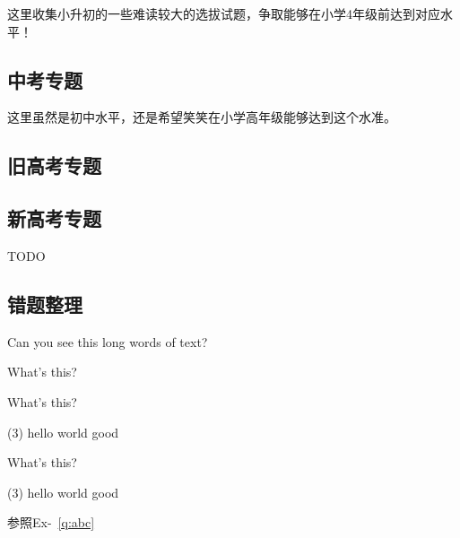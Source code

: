 \documentclass[a4paper]{article}
\begin{document}
这里收集小升初的一些难读较大的选拔试题，争取能够在小学4年级前达到对应水平！

%

  \subsection{中考专题}
这里虽然是初中水平，还是希望笑笑在小学高年级能够达到这个水准。

%
%

  \subsection{旧高考专题}
%


  \subsection{新高考专题}
TODO

  \subsection{错题整理}

% 

  Can you see this long words of text?


\begin{question}[type=exam,name=abc]
What's this?

\end{question}

\begin{question}[type=exam]
What's \blank[width=1cm]{} this?
\vspace{-0.3cm} %
\begin{tasks}(3)
 \task hello
 \task world
 \task good
\end{tasks}

\end{question}

\begin{question}[type=exam]\label{q:abc}
What's \blank[width=1cm] this?
\vspace{-0.3cm} %
\begin{tasks}(3)
 \task hello
 \task world
 \task good
\end{tasks}

\end{question}

参照Ex-~\ref{q:abc}
\end{document}
